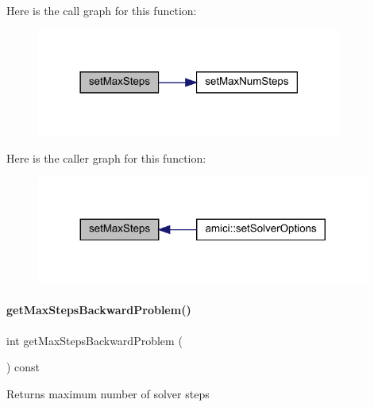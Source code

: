 Here is the call graph for this function\+:
\nopagebreak
\begin{figure}[H]
\begin{center}
\leavevmode
\includegraphics[width=285pt]{classamici_1_1_solver_ab321627a9f9d22013638e0eb9b14d2dc_cgraph}
\end{center}
\end{figure}
Here is the caller graph for this function\+:
\nopagebreak
\begin{figure}[H]
\begin{center}
\leavevmode
\includegraphics[width=311pt]{classamici_1_1_solver_ab321627a9f9d22013638e0eb9b14d2dc_icgraph}
\end{center}
\end{figure}
\mbox{\label{classamici_1_1_solver_a8f683e8adf7b34cab6dff296b1d38c83}} 
\paragraph{\texorpdfstring{get\+Max\+Steps\+Backward\+Problem()}{getMaxStepsBackwardProblem()}}
{\footnotesize\ttfamily int get\+Max\+Steps\+Backward\+Problem (\begin{DoxyParamCaption}{ }\end{DoxyParamCaption}) const}

\begin{DoxyReturn}{Returns}
maximum number of solver steps 
\end{DoxyReturn}


